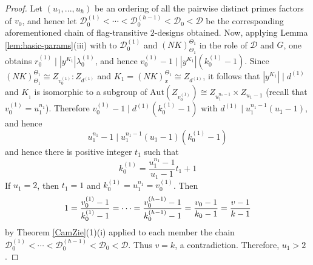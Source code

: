 \documentclass[a4paper,twopage,reqno,12pt]{amsart}
\theoremstyle{definition}
\numberwithin{equation}{section}
\begin{document}
\begin{proof}
Let $\left( u_{1},...,u_{h}\right) $ be an ordering of all the pairwise
distinct primes factors of $v_{0}$, and hence let $\mathcal{D}%
_{0}^{(1)}<\cdots <\mathcal{D}_{0}^{(h-1)}<\mathcal{D}_{0}<\mathcal{D}$ be
the corresponding aforementioned chain of flag-transitive $2$-designs obtained. Now, applying Lemma \ref{lem:basic-params}(iii) with to $\mathcal{D}_{0}^{(1)}$ and $(NK)_{\Theta _{1}}^{\Theta _{1}}$ in the role of $\mathcal{D}$ and $G$, one obtains $r_{0}^{(1)}\mid \left\vert
y^{K_{1}}\right\vert \lambda _{0}^{(1)}$, and hence $v_{0}^{(1)}-1\mid \left\vert y^{K_{1}}\right\vert (k_{0}^{(1)}-1)$. Since $(NK)_{\Theta _{1}}^{\Theta _{1}}\cong Z_{v_{0}^{(1)}}:Z_{d^{(1)}}$ and $K_{1}=(NK)_{x}^{\Theta _{1}}\cong Z_{d^{(1)}}$, it follows that $\left\vert y^{K_{1}}\right\vert \mid d^{(1)}$ and $ 
K_{_{1}}$ is isomorphic to a subgroup of $ \mathrm{Aut}(Z_{v_{0}^{(1)}})\cong Z_{u_{1}^{n_{1}-1}}\times
Z_{u_{1}-1}$ (recall that $v_{0}^{(1)}=u_{1}^{n_{1}}$). Therefore $%
v_{0}^{(1)}-1\mid d^{(1)} (k_{0}^{(1)}-1)$  with $d^{(1)}\mid u_{1}^{n_{1}-1}(u_{1}-1)$, and hence
\[
u_{1}^{n_{1}}-1\mid u_{1}^{n_{1}-1}(u_{1}-1)(k_{0}^{(1)}-1) 
\]%
and hence there is positive integer $t_{1}$ such that 
\begin{equation}
k_{0}^{(1)}=\frac{u_{1}^{n_{1}}-1}{u_{1}-1}t_{1}+1  \label{K01}
\end{equation}%
If $u_{1}=2$, then $t_{1}=1$ and $k_{0}^{(1)}=u_{1}^{n_{1}}=v_{0}^{(1)}$.
Then%
\[
1=\frac{v_{0}^{(1)}-1}{k_{0}^{(1)}-1}=\cdots =\frac{v_{0}^{(h-1)}-1}{%
k_{0}^{(h-1)}-1}=\frac{v_{0}-1}{k_{0}-1}=\frac{v-1}{k-1} 
\]%
by Theorem \ref{CamZie}(1)(i) applied to each member the chain $\mathcal{D}%
_{0}^{(1)}<\cdots <\mathcal{D}_{0}^{(h-1)}<\mathcal{D}_{0}<\mathcal{D}$.
Thus $v=k$, a contradiction. Therefore, $u_{1}>2$.


\end{proof}
\end{document}
